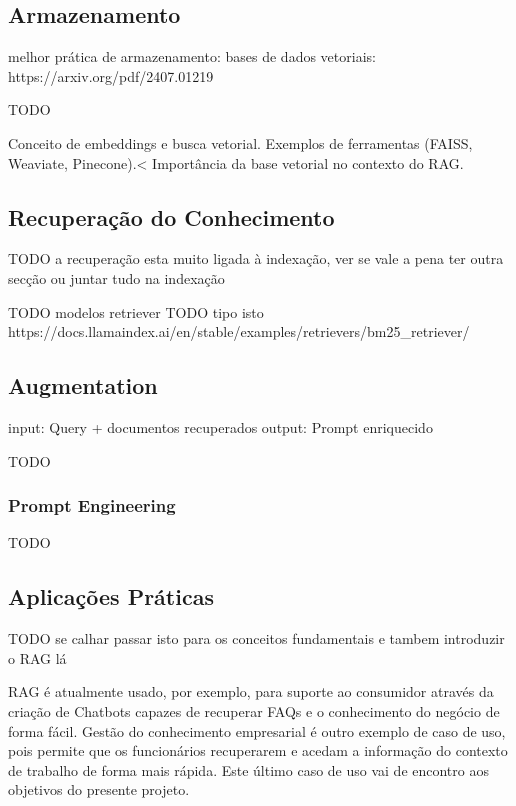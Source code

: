 \subsection{Armazenamento}


melhor prática de armazenamento: bases de dados vetoriais: https://arxiv.org/pdf/2407.01219

TODO

Conceito de embeddings e busca vetorial.
Exemplos de ferramentas (FAISS, Weaviate, Pinecone).<
Importância da base vetorial no contexto do RAG.




\subsection{Recuperação do Conhecimento}

TODO a recuperação esta muito ligada à indexação, ver se vale a pena ter outra secção ou juntar tudo na indexação

\label{recu-context}

TODO modelos retriever
TODO tipo isto https://docs.llamaindex.ai/en/stable/examples/retrievers/bm25_retriever/


\subsection{Augmentation}
\label{augmentation}

input: Query + documentos recuperados
output: Prompt enriquecido

TODO

\subsubsection{Prompt Engineering}

TODO

\subsection{Aplicações Práticas}

TODO se calhar passar isto para os conceitos fundamentais e tambem introduzir o RAG lá 

RAG é atualmente usado, por exemplo, para suporte ao consumidor através da criação de Chatbots capazes de recuperar FAQs e o conhecimento do negócio de forma fácil. Gestão do conhecimento empresarial é outro exemplo de caso de uso, pois permite que os funcionários recuperarem e acedam a informação do contexto de trabalho de forma mais rápida. Este último caso de uso vai de encontro aos objetivos do presente projeto. 




